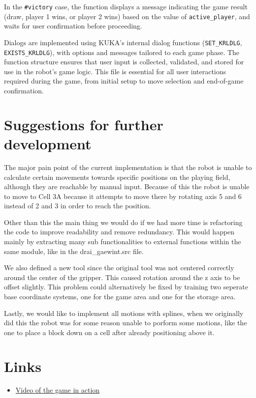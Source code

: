 \documentclass{article}
\begin{document}
            In the \texttt{\#victory} case, the function displays a message indicating the game result (draw, player 1 wins, or player 2 wins) based on the value of \texttt{active\_player}, and waits for user confirmation before proceeding.

            Dialogs are implemented using KUKA's internal dialog functions (\texttt{SET\_KRLDLG}, \texttt{EXISTS\_KRLDLG}), with options and messages tailored to each game phase. The function structure ensures that user input is collected, validated, and stored for use in the robot's game logic. This file is essential for all user interactions required during the game, from initial setup to move selection and end-of-game confirmation.

    \newpage
    \section{Suggestions for further development}
        The major pain point of the current implementation is that the robot is unable to calculate certain movements towards specific positions on the playing field, although they are reachable by manual input. Because of this the robot is unable to move to Cell 3A because it attempts to move there by rotating axis 5 and 6 instead of 2 and 3 in order to reach the position. 

        Other than this the main thing we would do if we had more time is refactoring the code to  improve readability and remove redundancy. This would happen mainly by extracting many sub functionalities to external functions within the same module, like in the drai\_gaewint.src file. 

        We also defined a new tool since the original tool was not centered correctly around the center of the gripper. This caused rotation around the z axis to be offset slightly. This problem could alternatively be fixed by training two seperate base coordinate systems, one for the game area and one for the storage area.
        
        Lastly, we would like to implement all motions with splines, when we originally did this the robot was for some reason unable to porform some motions, like the one to place a block down on a cell after already positioning above it. 

    \newpage

    \section{Links}
        \begin{itemize}
            \item \href{https://drive.google.com/file/d/1ksEsBeFS2djIdrCemAV6TvRpJgihrTrF/view?usp=drivesdk}{Video of the game in action}
        \end{itemize}
    \newpage
\end{document}
